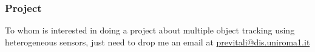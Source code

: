 \begin{frame}
	\frametitle{Project}
	
	\vspace{0.5cm}
	
	To whom is interested in doing a project about multiple object tracking using heterogeneous
	sensors, just need to drop me an email at \url{previtali@dis.uniroma1.it}\\
	
	\vspace{-0.3cm}
	
	\begin{center}
	\end{center}
\end{frame}
